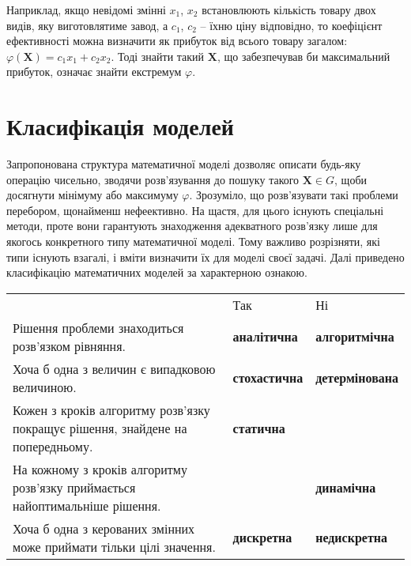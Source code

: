 \documentclass[../book.tex]{subfiles}
\begin{document}
Наприклад, якщо невідомі змінні $x_1$, $x_2$ встановлюють кількість товару двох видів, яку виготовлятиме завод, а $c_1$, $c_2$ -- їхню ціну відповідно, то коефіцієнт ефективності можна визначити як прибуток від всього товару загалом: ${\varphi(\mathbf{X})} = {c_1 x_1} + {c_2 x_2}$. Тоді знайти такий $\mathbf{X}$, що забезпечував би максимальний прибуток, означає знайти екстремум $\varphi$.

\section{Класифікація моделей}

Запропонована структура математичної моделі дозволяє описати будь-яку операцію чисельно, зводячи розв'язування до пошуку такого ${\mathbf{X} \in G}$, щоби досягнути мінімуму або максимуму $\varphi$. Зрозуміло, що роз\-в'яз\-ува\-ти такі проблеми перебором, щонайменш нефеективно. На щастя, для цього існують спеціальні методи, проте вони гарантують знаходження адекватного розв'язку лише для якогось конкретного типу математичної моделі. Тому важливо розрізняти, які типи існують взагалі, і вміти визначити їх для моделі своєї задачі. Далі приведено класифікацію математичних моделей за характерною ознакою.

\begin{table}[!ht]
\centering
\begin{tabular}{p{5.5cm}|ll}
 & Так & Ні \\
 Рішення проблеми знаходиться розв'язком рівняння. & \textbf{аналітична} & \textbf{алгоритмічна} \\
 Хоча б одна з величин є випадковою величиною. & \textbf{стохастична} & \textbf{детермінована} \\
 Кожен з кроків алгоритму розв'язку покращує рішення, знайдене на попередньому. & \textbf{статична} & \\
 На кожному з кроків алгоритму розв'язку приймається найоптимальніше рішення. & & \textbf{динамічна} \\
 Хоча б одна з керованих змінних може приймати тільки цілі значення. & \textbf{дискретна} & \textbf{недискретна}
\end{tabular}
\end{table}
\end{document}
